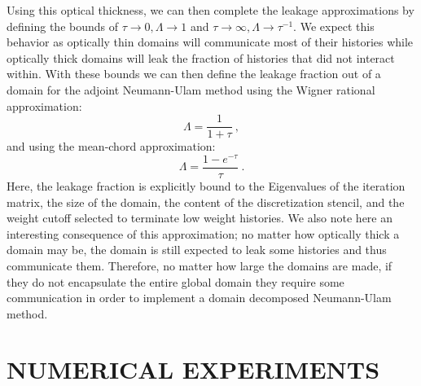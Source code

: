 \documentclass{mc2013}
\begin{document}
Using this optical thickness, we can then complete the leakage
approximations by defining the bounds of $\tau \rightarrow 0, \Lambda
\rightarrow 1$ and $\tau \rightarrow \infty, \Lambda \rightarrow
\tau^{-1}$. We expect this behavior as optically thin domains will
communicate most of their histories while optically thick domains will
leak the fraction of histories that did not interact within. With
these bounds we can then define the leakage fraction out of a domain
for the adjoint Neumann-Ulam method using the Wigner rational
approximation:
\begin{equation}
  \Lambda = \frac{1}{1+\tau}\:,
  \label{eq:wigner_domain_leakage}
\end{equation}
and using the mean-chord approximation:
\begin{equation}
  \Lambda = \frac{1-e^{-\tau}}{\tau}\:.
  \label{eq:mean_chord_domain_leakage}
\end{equation}
Here, the leakage fraction is explicitly bound to the Eigenvalues of
the iteration matrix, the size of the domain, the content of the
discretization stencil, and the weight cutoff selected to terminate
low weight histories.  We also note here an interesting consequence of
this approximation; no matter how optically thick a domain may be, the
domain is still expected to leak some histories and thus communicate
them. Therefore, no matter how large the domains are made, if they do
not encapsulate the entire global domain they require some
communication in order to implement a domain decomposed Neumann-Ulam
method.

\section{NUMERICAL EXPERIMENTS}
\label{sec:numerical_experiments}
\end{document}
